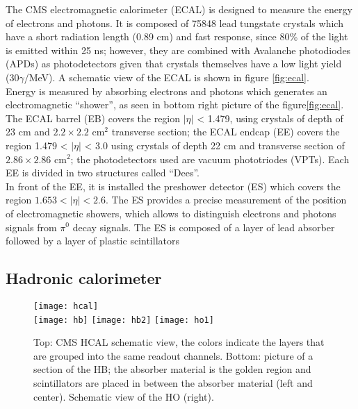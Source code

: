 \noindent The CMS electromagnetic calorimeter (ECAL) is designed to measure the energy of electrons and photons. It is composed of 75848 lead tungstate crystals which have a short radiation length (0.89 cm) and fast response, since 80\% of the light is emitted within 25 ns; however, they are combined with Avalanche photodiodes (APDs) as photodetectors given that crystals themselves have a low light yield (30$\gamma$/MeV). A schematic view of the ECAL is shown in figure \ref{fig:ecal}.\\

\noindent Energy is measured by absorbing electrons and photons which generates an electromagnetic ``shower'', as seen in bottom right picture of the figure\ref{fig:ecal}. The ECAL barrel (EB) covers the region $|\eta|$ < 1.479, using crystals of depth of 23 cm and  $2.2\times 2.2$ cm$^2$ transverse section; the ECAL endcap (EE) covers the region 1.479 < $|\eta|$ < 3.0 using crystals of depth 22 cm and transverse section of $2.86\times2.86$ cm$^2$; the photodetectors used are vacuum phototriodes (VPTs). Each EE is divided in two structures called ``Dees''.\\

\noindent In front of the EE, it is installed the preshower detector (ES) which covers the region $1.653 < |\eta| < 2.6$. The ES provides a precise measurement of the position of electromagnetic showers, which allows to distinguish electrons and photons signals from $\pi^0$ decay signals. The ES is composed of a layer of lead absorber followed by a layer of plastic scintillators

\subsection{Hadronic calorimeter}

\begin{figure}[h!]
  \centering
  \texttt{[image: hcal]}\\
  \texttt{[image: hb]}
  \texttt{[image: hb2]}
  \texttt{[image: ho1]} 
  \caption[CMS HCAL schematic view]{Top: CMS HCAL schematic view, the colors indicate the layers that are grouped into the same readout channels. Bottom: picture of a section of the HB; the absorber material is the golden region and scintillators are placed in between the absorber material (left and center). Schematic view of the HO (right).\cite{hcal,hb} }
  \label{fig:hcal}
\end{figure}

